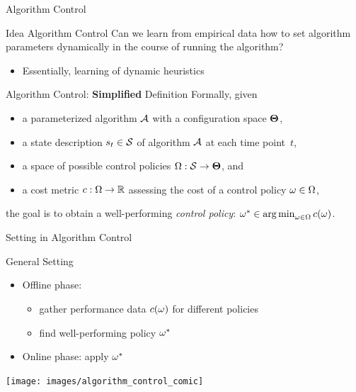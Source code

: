 \begin{frame}[c]{Algorithm Control}

\begin{block}{Idea Algorithm Control}
Can we \alert{learn from empirical data} how to set algorithm parameters dynamically in the course of running the algorithm?
\pause
\begin{itemize}
  \item Essentially, learning of dynamic heuristics
\end{itemize}
\end{block}

\pause

\begin{block}{Algorithm Control: \textbf{Simplified} Definition}
Formally, given
\begin{itemize}
  \item a parameterized algorithm $\mathcal{A}$ with a configuration space $\mathbf{\Theta}$,
  \pause
  \item a state description $s_t \in \mathcal{S}$ of algorithm $\mathcal{A}$ at each time point~$t$,
  \pause
  \item a space of possible control policies $\Omega: \mathcal{S} \to \mathbf{\Theta}$, and
  \pause
  \item a cost metric $c: \Omega \to \mathbb{R}$ assessing the cost of a control policy $\omega \in \Omega$,
\end{itemize}

\noindent the goal is to obtain a well-performing \emph{control policy}: $\omega^* \in \operatorname*{arg\,min}_{\omega \in \Omega} c(\omega)$.
\end{block}

\end{frame}
\begin{frame}[c]{Setting in Algorithm Control}

\begin{block}{General Setting}
\begin{itemize}
  \item Offline phase: 
  \begin{itemize}
    \item gather performance data $c(\omega)$ for different policies
    \item find well-performing policy $\omega^*$
  \end{itemize}
  \item Online phase: apply $\omega^*$
\end{itemize}
\end{block}

\medskip

\texttt{[image: images/algorithm\_control\_comic]}

\end{frame}
